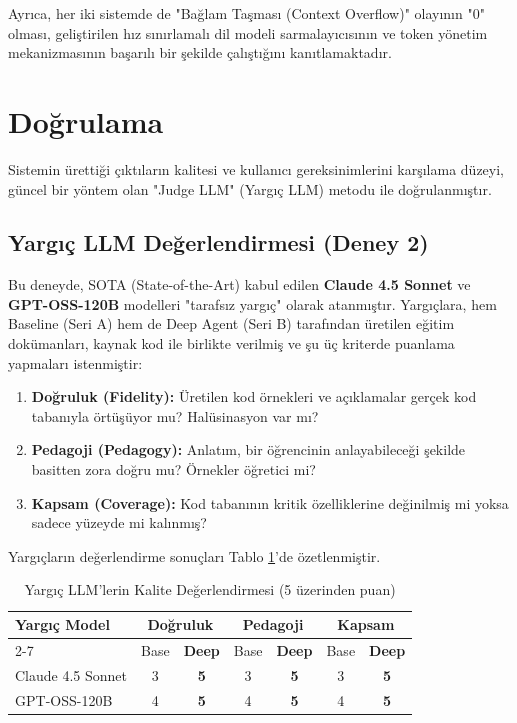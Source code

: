 Ayrıca, her iki sistemde de "Bağlam Taşması (Context Overflow)" olayının "0" olması, geliştirilen hız sınırlamalı dil modeli sarmalayıcısının ve token yönetim mekanizmasının başarılı bir şekilde çalıştığını kanıtlamaktadır.

\section{Doğrulama}
\label{sec:dogrulama}

Sistemin ürettiği çıktıların kalitesi ve kullanıcı gereksinimlerini karşılama düzeyi, güncel bir yöntem olan "Judge LLM" (Yargıç LLM) metodu ile doğrulanmıştır.

\subsection{Yargıç LLM Değerlendirmesi (Deney 2)}

Bu deneyde, SOTA (State-of-the-Art) kabul edilen \textbf{Claude 4.5 Sonnet} ve \textbf{GPT-OSS-120B} modelleri "tarafsız yargıç" olarak atanmıştır. Yargıçlara, hem Baseline (Seri A) hem de Deep Agent (Seri B) tarafından üretilen eğitim dokümanları, kaynak kod ile birlikte verilmiş ve şu üç kriterde puanlama yapmaları istenmiştir:

\begin{enumerate}
    \item \textbf{Doğruluk (Fidelity):} Üretilen kod örnekleri ve açıklamalar gerçek kod tabanıyla örtüşüyor mu? Halüsinasyon var mı?
    \item \textbf{Pedagoji (Pedagogy):} Anlatım, bir öğrencinin anlayabileceği şekilde basitten zora doğru mu? Örnekler öğretici mi?
    \item \textbf{Kapsam (Coverage):} Kod tabanının kritik özelliklerine değinilmiş mi yoksa sadece yüzeyde mi kalınmış?
\end{enumerate}

Yargıçların değerlendirme sonuçları Tablo \ref{tab:win-rate}’de özetlenmiştir.

\begin{table}[htbp]
    \centering
    \caption{Yargıç LLM'lerin Kalite Değerlendirmesi (5 üzerinden puan)}
    \label{tab:win-rate}
    \begin{tabular}{|l|c|c|c|c|c|c|}
        \hline
        \multirow{2}{*}{\textbf{Yargıç Model}} & \multicolumn{2}{c|}{\textbf{Doğruluk}} & \multicolumn{2}{c|}{\textbf{Pedagoji}} & \multicolumn{2}{c|}{\textbf{Kapsam}} \\
        \cline{2-7}
         & Base & \textbf{Deep} & Base & \textbf{Deep} & Base & \textbf{Deep} \\
        \hline
        Claude 4.5 Sonnet & 3 & \textbf{5} & 3 & \textbf{5} & 3 & \textbf{5} \\
        \hline
        GPT-OSS-120B & 4 & \textbf{5} & 4 & \textbf{5} & 4 & \textbf{5} \\
        \hline
    \end{tabular}
\end{table}

